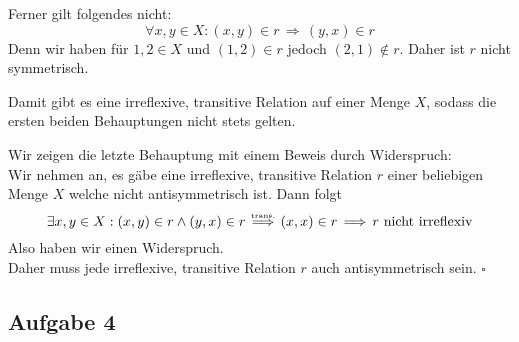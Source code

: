 \documentclass[a4paper,graphics,11pt]{article}
\newcommand{\aufgabe}[1]{\subsection*{Aufgabe #1}}
\newcommand{\up}[2]{\mathrel{\overset{\makebox[0pt]{\mbox{\normalfont\tiny #2}}}{#1}}}
\begin{document}
Ferner gilt folgendes nicht:
$$
	\forall x,y \in X : (x,y) \in r \,\Longrightarrow\, (y,x) \in r
$$
Denn wir haben für $1, 2 \in X$ und $(1,2) \in r$ jedoch $(2,1) \notin r $. Daher ist $r$ nicht symmetrisch.

Damit gibt es eine irreflexive, transitive Relation auf einer Menge $X$, sodass die ersten beiden Behauptungen
nicht stets gelten.

Wir zeigen die letzte Behauptung mit einem Beweis durch Widerspruch: \\

Wir nehmen an, es gäbe eine irreflexive, transitive Relation $r$ einer beliebigen Menge $X$ welche nicht antisymmetrisch ist. Dann folgt
$$
	\exists x,y \in X : (x,y) \in r \land (y,x) \in r
	\up{\,\Longrightarrow\,}{trans.} (x,x) \in r \,\Longrightarrow\, r\ \text{nicht irreflexiv}
$$
Also haben wir einen Widerspruch.\\
Daher muss jede irreflexive, transitive Relation $r$ auch antisymmetrisch sein.
\hfill$\square$

\newpage
\aufgabe{4}


\end{document}
